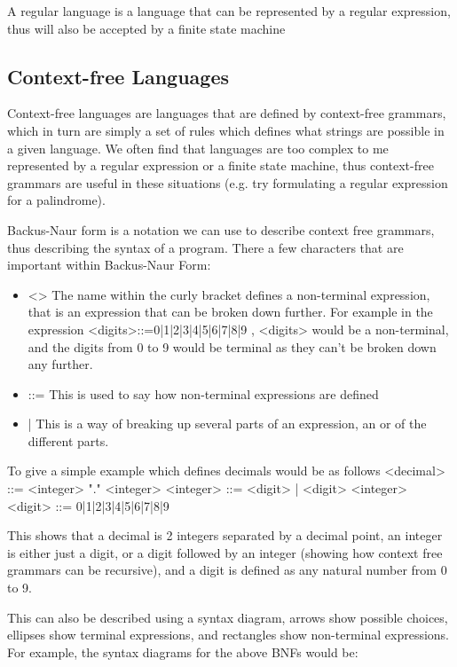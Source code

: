   \noindent
  A regular language is a language that can be represented by a regular expression, thus will also be accepted by a finite state machine
  
\subsection{Context-free Languages}
  
  \noindent
  Context-free languages are languages that are defined by context-free grammars, which in turn are simply a set of rules which defines what strings are possible in a given language. We often find that languages are too complex to me represented by a regular expression or a finite state machine, thus context-free grammars are useful in these situations (e.g. try formulating a regular expression for a palindrome).
  
  Backus-Naur form is a notation we can use to describe context free grammars, thus describing the syntax of a program. There a few characters that are important within Backus-Naur Form:
  \begin{itemize}
  	\item <>
	  	\subitem The name within the curly bracket defines a non-terminal expression, that is an expression that can be broken down further. For example in the expression <digits>::=0|1|2|3|4|5|6|7|8|9 , <digits> would be a non-terminal, and the digits from 0 to 9 would be terminal as they can't be broken down any further.
  	\item ::=
	  	\subitem This is used to say how non-terminal expressions are defined
  	\item |
	  	\subitem This is a way of breaking up several parts of an expression, an or of the different parts.
  \end{itemize}
  
  To give a simple example which defines decimals would be as follows
  <decimal> ::= <integer> "." <integer>
  <integer> ::= <digit> | <digit> <integer>
  <digit> ::= 0|1|2|3|4|5|6|7|8|9
  
  This shows that a decimal is 2 integers separated by a decimal point, an integer is either just a digit, or a digit followed by an integer (showing how context free grammars can be recursive), and a digit is defined as any natural number from 0 to 9.
  
  This can also be described using a syntax diagram, arrows show possible choices, ellipses show terminal expressions, and rectangles show non-terminal expressions. For example, the syntax diagrams for the above BNFs would be:
  
